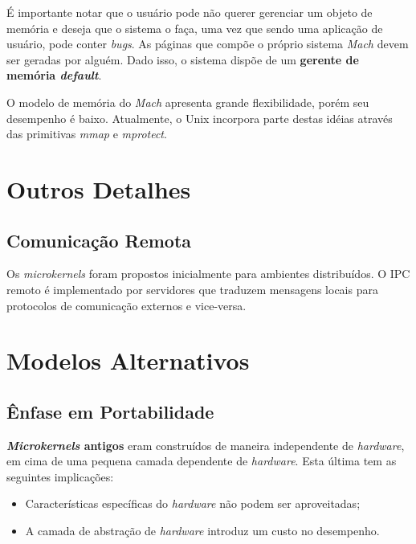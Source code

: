 
É importante notar que o usuário pode não querer gerenciar um objeto de memória e deseja que o sistema o faça, uma vez que sendo uma aplicação de usuário, pode conter \textit{bugs}. As páginas que compõe o próprio sistema \textit{Mach} devem ser geradas por alguém. Dado isso, o sistema dispõe de um \textbf{gerente de memória \textit{default}}.

O modelo de memória do \textit{Mach} apresenta grande flexibilidade, porém seu desempenho é baixo. Atualmente, o Unix incorpora parte destas idéias através das primitivas \textit{mmap} e \textit{mprotect}.









\section{Outros Detalhes}

\subsection{Comunicação Remota}
Os \textit{microkernels} foram propostos inicialmente para ambientes distribuídos. O IPC remoto é implementado por servidores que traduzem mensagens locais para protocolos de comunicação externos e vice-versa.





\section{Modelos Alternativos}

\subsection{Ênfase em Portabilidade}
\textbf{\textit{Microkernels} antigos} eram construídos de maneira independente de \textit{hardware}, em cima de uma pequena camada dependente de \textit{hardware}. Esta última tem as seguintes implicações:
\begin{itemize}
  \item Características específicas do \textit{hardware} não podem ser aproveitadas;

  \item A camada de abstração de \textit{hardware} introduz um custo no desempenho.
\end{itemize}

